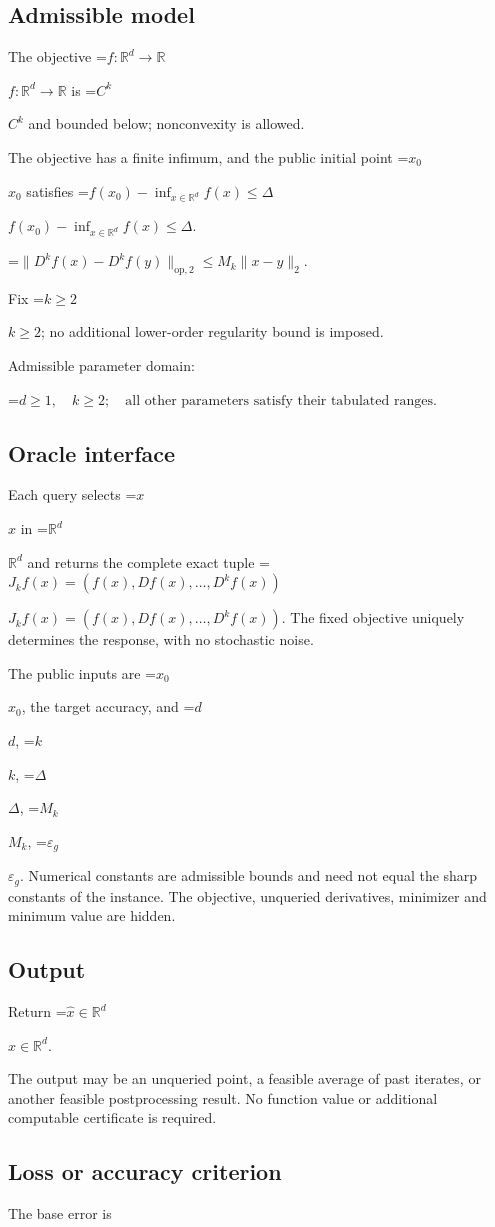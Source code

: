 \documentclass[10pt,a4paper]{article}
\newcommand{\AtlasMath}[1]{\par\begingroup\centering\setbox0=\hbox{$\displaystyle #1$}\ifdim\wd0>1.4\linewidth\typeout{ATLAS WIDE FORMULA: \the\wd0}\fi\ifdim\wd0>\linewidth\resizebox{\linewidth}{!}{\box0}\else\box0\fi\par\endgroup}
\newcommand{\AtlasInlineMath}[1]{\begingroup\setbox0=\hbox{$#1$}\ifdim\wd0>.4\linewidth\endgroup\AtlasMath{#1}\else\endgroup$#1$\fi}
\begin{document}
\subsection{Admissible model}
The objective \AtlasInlineMath{f:\mathbb{R}^d\to\mathbb{R}} is \AtlasInlineMath{C^k} and bounded below; nonconvexity is allowed.

The objective has a finite infimum, and the public initial point \AtlasInlineMath{x_0} satisfies \AtlasInlineMath{f(x_0)-\inf_{x\in \mathbb{R}^d}f(x)\le\Delta}.


\AtlasMath{\|D^{k}f(x)-D^{k}f(y)\|_{\mathrm{op},2}\le M_k\|x-y\|_{2}.}


Fix \AtlasInlineMath{k\ge2}; no additional lower-order regularity bound is imposed.

Admissible parameter domain:


\AtlasMath{d\ge1,\quad k\ge2;\quad\text{all other parameters satisfy their tabulated ranges}.}


\subsection{Oracle interface}
Each query selects \AtlasInlineMath{x} in \AtlasInlineMath{\mathbb{R}^d} and returns the complete exact tuple \AtlasInlineMath{J_{k}f(x)=(f(x),Df(x),\ldots,D^{k}f(x))}. The fixed objective uniquely determines the response, with no stochastic noise.

The public inputs are \AtlasInlineMath{x_0}, the target accuracy, and \AtlasInlineMath{d}, \AtlasInlineMath{k}, \AtlasInlineMath{\Delta}, \AtlasInlineMath{M_k}, \AtlasInlineMath{\varepsilon_g}. Numerical constants are admissible bounds and need not equal the sharp constants of the instance. The objective, unqueried derivatives, minimizer and minimum value are hidden.

\subsection{Output}
Return \AtlasInlineMath{\widehat{x}\in \mathbb{R}^d}.

The output may be an unqueried point, a feasible average of past iterates, or another feasible postprocessing result. No function value or additional computable certificate is required.

\subsection{Loss or accuracy criterion}
The base error is
\end{document}
